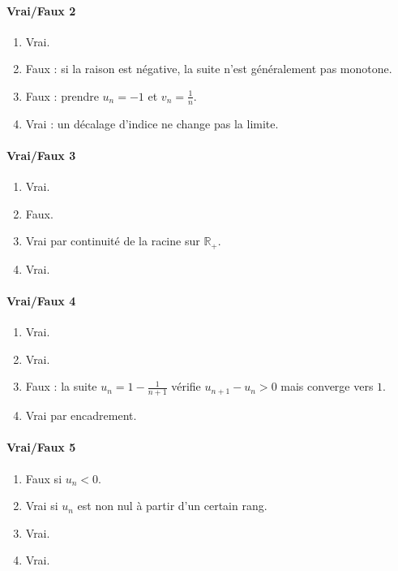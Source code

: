 \documentclass[11pt,a4paper]{article}
\theoremstyle{definition}
\newcommand{\R}{\mathbb{R}}
\begin{document}
\paragraph{Vrai/Faux 2}
\begin{enumerate}[label=\alph*)]
    \item Vrai.
    \item Faux : si la raison est négative, la suite n'est généralement pas monotone.
    \item Faux : prendre $u_n=-1$ et $v_n=\frac1n$.
    \item Vrai : un décalage d'indice ne change pas la limite.
\end{enumerate}

\paragraph{Vrai/Faux 3}
\begin{enumerate}[label=\alph*)]
    \item Vrai.
    \item Faux.
    \item Vrai par continuité de la racine sur $\R_+$.
    \item Vrai.
\end{enumerate}

\paragraph{Vrai/Faux 4}
\begin{enumerate}[label=\alph*)]
    \item Vrai.
    \item Vrai.
    \item Faux : la suite $u_n=1-\frac1{n+1}$ vérifie $u_{n+1}-u_n>0$ mais converge vers $1$.
    \item Vrai par encadrement.
\end{enumerate}

\paragraph{Vrai/Faux 5}
\begin{enumerate}[label=\alph*)]
    \item Faux si $u_n<0$.
    \item Vrai si $u_n$ est non nul à partir d'un certain rang.
    \item Vrai.
    \item Vrai.
\end{enumerate}
\end{document}
